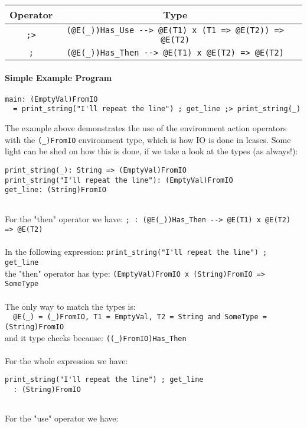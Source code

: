 \documentclass[diploma]{softlab-thesis}
\begin{document}
\begin{center}
\begin{tabular}{ |c|c|c| }
\hline
Operator & Type
\\
\hline
\hline
\verb|;>| & \verb|(@E(_))Has_Use --> @E(T1) x (T1 => @E(T2)) => @E(T2)|
\\
\hline
\verb|;| & \verb|(@E(_))Has_Then --> @E(T1) x @E(T2) => @E(T2)|
\\
\hline
\end{tabular}
\end{center}

\paragraph{Simple Example Program}
\begin{verbatim}
main: (EmptyVal)FromIO
  = print_string("I'll repeat the line") ; get_line ;> print_string(_)
\end{verbatim}
The example above demonstrates the use of the environment action operators with
the \verb|(_)FromIO| environment type, which is how IO is done in lcases. Some
light can be shed on how this is done, if we take a look at the types (as
always!):
\begin{verbatim}
print_string(_): String => (EmptyVal)FromIO
print_string("I'll repeat the line"): (EmptyVal)FromIO
get_line: (String)FromIO


\end{verbatim}
For the "then" operator we have:
\verb|; : (@E(_))Has_Then --> @E(T1) x @E(T2) => @E(T2)|
\\\\
In the following expression:
\verb|print_string("I'll repeat the line") ; get_line|
\\
the "then" operator has type:
\verb|(EmptyVal)FromIO x (String)FromIO => SomeType|
\\\\
The only way to match the types is:
\\
\verb|  @E(_) = (_)FromIO, T1 = EmptyVal, T2 = String and SomeType = (String)FromIO|
\\
and it type checks because: \verb|((_)FromIO)Has_Then|
\\\\
For the whole expression we have:
\begin{verbatim}
print_string("I'll repeat the line") ; get_line
  : (String)FromIO


\end{verbatim}
For the "use" operator we have:
\end{document}
